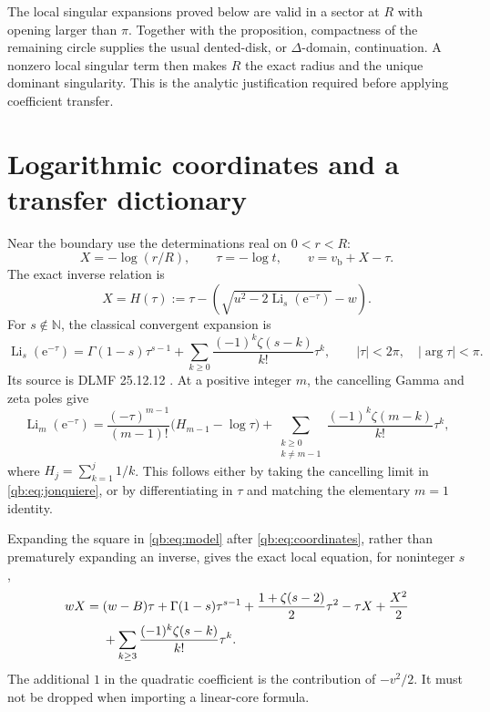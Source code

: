 \documentclass[11pt,a4paper]{article}
\theoremstyle{definition}\newtheorem{definition}[theorem]{Definition}
\theoremstyle{remark}\newtheorem{remark}[theorem]{Remark}
\newcommand{\Li}{\operatorname{Li}}
\newcommand{\ee}{\mathrm e}
\newcommand{\N}{\mathbb N}
\newcommand{\vb}{v_{\mathrm b}}
\numberwithin{equation}{section}
\begin{document}
The local singular expansions proved below are valid in a sector at $R$
with opening larger than $\pi$. Together with the proposition, compactness
of the remaining circle supplies the usual dented-disk, or
$\Delta$-domain, continuation. A nonzero local singular term then makes
$R$ the exact radius and the unique dominant singularity. This is the
analytic justification required before applying coefficient transfer.

\section{Logarithmic coordinates and a transfer dictionary}\label{qb:sec:coordinates}

Near the boundary use the determinations real on $0<r<R$:
\begin{equation}\label{qb:eq:coordinates}
 X=-\log(r/R),\qquad \tau=-\log t,\qquad
 v=\vb+X-\tau.
\end{equation}
The exact inverse relation is
\begin{equation}\label{qb:eq:H}
 X=H(\tau):=\tau-
 \left(\sqrt{u^2-2\Li_s(\ee^{-\tau})}-w\right).
\end{equation}
For $s\notin\N$, the classical convergent expansion is
\begin{equation}\label{qb:eq:jonquiere}
 \Li_s(\ee^{-\tau})=
 \Gamma(1-s)\tau^{s-1}+
 \sum_{k\ge0}\frac{(-1)^k\zeta(s-k)}{k!}\tau^k,
 \qquad |\tau|<2\pi,\quad |\arg\tau|<\pi.
\end{equation}
Its source is DLMF 25.12.12 \cite{dlmfpoly}. At a positive integer $m$,
the cancelling Gamma and zeta poles give
\begin{equation}\label{qb:eq:integer}
 \Li_m(\ee^{-\tau})=
 \frac{(-\tau)^{m-1}}{(m-1)!}\bigl(H_{m-1}-\log\tau\bigr)
 +\sum_{\substack{k\ge0\\k\ne m-1}}
 \frac{(-1)^k\zeta(m-k)}{k!}\tau^k,
\end{equation}
where $H_j=\sum_{k=1}^j1/k$. This follows either by taking the cancelling
limit in \eqref{qb:eq:jonquiere}, or by differentiating in $\tau$ and
matching the elementary $m=1$ identity.

Expanding the square in \eqref{qb:eq:model} after
\eqref{qb:eq:coordinates}, rather than prematurely expanding an inverse,
gives the exact local equation, for noninteger $s$,
\begin{align}\label{qb:eq:master}
 wX={}&(w-B)\tau+\Gamma(1-s)\tau^{s-1}
 +\frac{1+\zeta(s-2)}2\tau^2-\tau X+\frac{X^2}{2}\notag\\
 &+\sum_{k\ge3}\frac{(-1)^k\zeta(s-k)}{k!}\tau^k.
\end{align}
The additional $1$ in the quadratic coefficient is the contribution of
$-v^2/2$. It must not be dropped when importing a linear-core formula.
\end{document}
